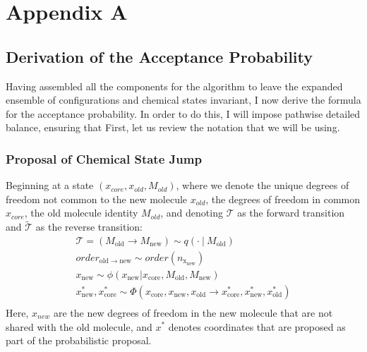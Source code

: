 \chapter{Appendix A}
%
\section{Derivation of the Acceptance Probability}
Having assembled all the components for the algorithm to leave the expanded ensemble of configurations and chemical states invariant, I now derive the formula for the acceptance probability.
%
In order to do this, I will impose pathwise detailed balance, ensuring that 
%
First, let us review the notation that we will be using.
%
\subsection{Proposal of Chemical State Jump}
%
Beginning at a state $(x_{core}, x_{old}, M_{old})$, where we denote the unique degrees of freedom not common to the new molecule $x_{old}$, the degrees of freedom in common $x_{core}$, the old molecule identity $M_{old}$, and denoting $\mathcal{T}$ as the forward transition and $\tilde{\mathcal{T}}$ as the reverse transition:
%
\begin{eqnarray}
    \mathcal{T} = (M_\mathrm{old} \rightarrow M_\mathrm{new}) \sim q(\cdot~|~M_\mathrm{old}) \\
    order_\mathrm{old \rightarrow new} \sim order(n_\mathrm{x_{new}}) \\
    x_\mathrm{new} \sim \phi(x_\mathrm{new} | x_\mathrm{core}, M_\mathrm{old}, M_\mathrm{new}) \\
    x^{*}_\mathrm{new}, x^{*}_\mathrm{core} \sim \Phi (x_\mathrm{core}, x_\mathrm{new}, x_\mathrm{old} \rightarrow x^{*}_\mathrm{core}, x^{*}_\mathrm{new}, x^{*}_\mathrm{old}) \\
\end{eqnarray}
%
Here, $x_{new}$ are the new degrees of freedom in the new molecule that are not shared with the old molecule, and $x^*$ denotes coordinates that are proposed as part of the probabilistic proposal.
%
%
